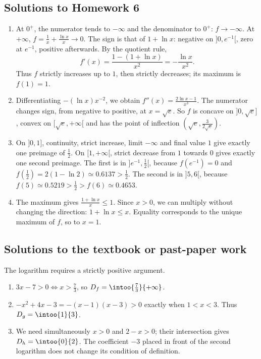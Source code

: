 \subsection{Solutions to Homework 6}\begin{enumerate}
\item At $0^+$, the numerator tends to $-\infty$ and the denominator to $0^+$: $f\to-\infty$. At $+\infty$, $f=\frac{1}{x}+\frac{\ln x}{x}\to0$. The sign is that of $1+\ln x$: negative on $]0,e^{-1}[$, zero at $e^{-1}$, positive afterwards. By the quotient rule,
\[f'(x)=\frac{1-(1+\ln x)}{x^2}=-\frac{\ln x}{x^2}.\]
Thus $f$ strictly increases up to $1$, then strictly decreases; its maximum is $f(1)=1$.
\item Differentiating $-(\ln x)x^{-2}$, we obtain $f''(x)=\frac{2\ln x-1}{x^3}$. The numerator changes sign, from negative to positive, at $x=\sqrt e$. So $f$ is concave on $]0,\sqrt e]$, convex on $[\sqrt e,+\infty[$ and has the point of inflection $(\sqrt{e},\frac{3}{2\sqrt e})$.
\item On $]0,1]$, continuity, strict increase, limit $-\infty$ and final value $1$ give exactly one preimage of $\frac{1}{2}$. On $[1,+\infty[$, strict decrease from $1$ towards $0$ gives exactly one second preimage. The first is in $]e^{-1},\frac{1}{2}[$, because $f(e^{-1})=0$ and $f(\frac{1}{2})=2(1-\ln2)\simeq\num{0,6137}>\frac{1}{2}$. The second is in $]5,6[$, because $f(5)\simeq\num{0,5219}>\frac{1}{2}>f(6)\simeq\num{0,4653}$.
\item The maximum gives $\frac{1+\ln x}{x}\le1$. Since $x>0$, we can multiply without changing the direction: $1+\ln x\le x$. Equality corresponds to the unique maximum of $f$, so to $x=1$.
\end{enumerate}

\subsection{Solutions to the textbook or past-paper work}The logarithm requires a strictly positive argument.
\begin{enumerate}
\item $3x-7>0\Longleftrightarrow x>\frac73$, so $D_f=\intoo{\frac73}{+\infty}$.
\item $-x^2+4x-3=-(x-1)(x-3)>0$ exactly when $1<x<3$. Thus $D_g=\intoo{1}{3}$.
\item We need simultaneously $x>0$ and $2-x>0$; their intersection gives $D_h=\intoo{0}{2}$. The coefficient $-3$ placed in front of the second logarithm does not change its condition of definition.
\end{enumerate}

\fi

